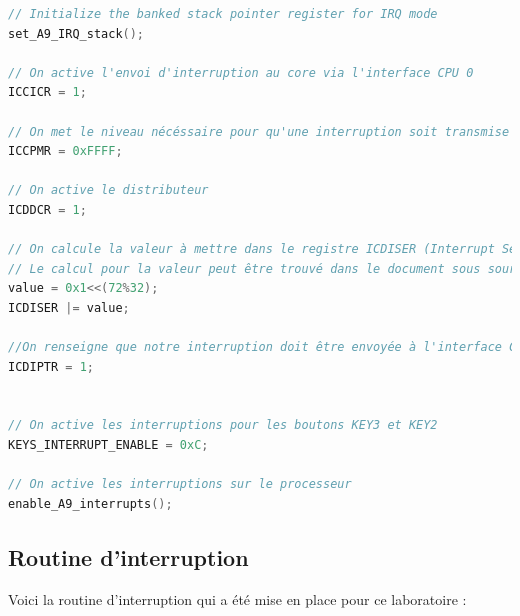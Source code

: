 \begin{lstlisting}[language=C]
// Initialize the banked stack pointer register for IRQ mode
set_A9_IRQ_stack();

// On active l'envoi d'interruption au core via l'interface CPU 0
ICCICR = 1;

// On met le niveau nécéssaire pour qu'une interruption soit transmise au cpu au minimum afin que toutes les interruptions passent.
ICCPMR = 0xFFFF;

// On active le distributeur
ICDDCR = 1;

// On calcule la valeur à mettre dans le registre ICDISER (Interrupt Set Enable Registers) et on remplit le registre
// Le calcul pour la valeur peut être trouvé dans le document sous source dans l'entête.
value = 0x1<<(72%32); 
ICDISER |= value;

//On renseigne que notre interruption doit être envoyée à l'interface CPU 0
ICDIPTR = 1;


// On active les interruptions pour les boutons KEY3 et KEY2
KEYS_INTERRUPT_ENABLE = 0xC;

// On active les interruptions sur le processeur
enable_A9_interrupts();
\end{lstlisting}


\subsection{Routine d'interruption}

Voici la routine d'interruption qui a été mise en place pour ce laboratoire :\\
 
